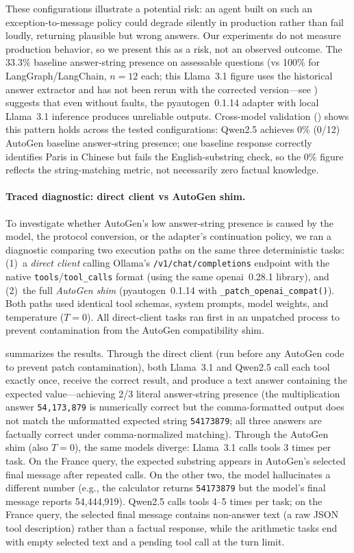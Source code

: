 \documentclass[make,article,submit,moreauthors,pdftex]{mdpi}
\newcommand{\Wrev}[1]{\texorpdfstring{{\color{RevisionOrange}#1}}{#1}}
\begin{document}
\Wrev{These configurations illustrate a potential risk: an agent built on such an exception-to-message policy could degrade silently in production rather than fail loudly, returning plausible but wrong answers. Our experiments do not measure production behavior, so we present this as a risk, not an observed outcome.} The 33.3\% baseline answer-string presence on assessable questions (vs 100\% for LangGraph/LangChain, $n = 12$ each; this Llama~3.1 figure uses the historical answer extractor and has not been rerun with the corrected version---see ) suggests that even without faults, the pyautogen~0.1.14 adapter with local Llama~3.1 inference produces unreliable outputs. Cross-model validation () shows this pattern holds across the tested configurations: Qwen2.5 achieves 0\% (0/12) AutoGen baseline answer-string presence; one baseline response correctly identifies Paris in Chinese but fails the English-substring check, so the 0\% figure reflects the string-matching metric, not necessarily zero factual knowledge.

\paragraph{Traced diagnostic: direct client vs AutoGen shim.}
{To investigate whether AutoGen's low answer-string presence is caused by the model, the protocol conversion, or the adapter's continuation policy, we ran a diagnostic comparing two execution paths on the same three deterministic tasks:
(1)~a \emph{direct client} calling Ollama's \texttt{/v1/chat/completions} endpoint with the native \texttt{tools}/\texttt{tool\_calls} format (using the same openai~0.28.1 library), and
(2)~the full \emph{AutoGen shim} (pyautogen~0.1.14 with \texttt{\_patch\_openai\_compat()}).
Both paths used identical tool schemas, system prompts, model weights, and temperature ($T = 0$). All direct-client tasks ran first in an unpatched process to prevent contamination from the AutoGen compatibility shim.}

 summarizes the results.
Through the direct client (run before any AutoGen code to prevent patch contamination), both Llama~3.1 and Qwen2.5 call each tool exactly once, receive the correct result, and produce a text answer containing the expected value---achieving 2/3 literal answer-string presence (the multiplication answer \texttt{54,173,879} is numerically correct but the comma-formatted output does not match the unformatted expected string \texttt{54173879}; all three answers are factually correct under comma-normalized matching).
Through the AutoGen shim (also $T = 0$), the same models diverge: Llama~3.1 calls tools 3 times per task. On the France query, the expected substring appears in AutoGen's selected final message after repeated calls. On the other two, the model hallucinates a different number (e.g., the calculator returns \texttt{54173879} but the model's final message reports 54{,}444{,}919). Qwen2.5 calls tools 4--5 times per task; on the France query, the selected final message contains non-answer text (a raw JSON tool description) rather than a factual response, while the arithmetic tasks end with empty selected text and a pending tool call at the turn limit.
\end{document}
